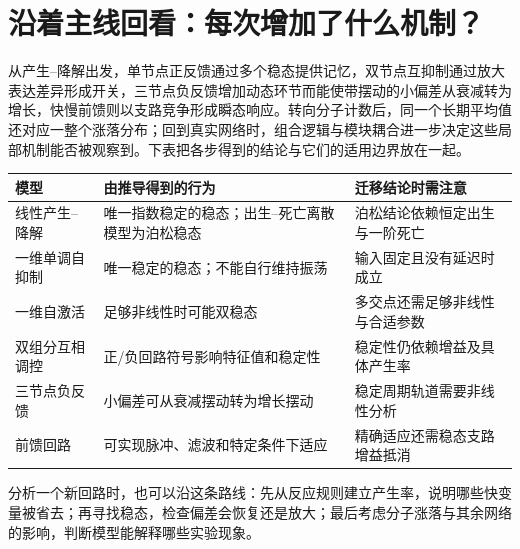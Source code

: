 \chapter{沿着主线回看：每次增加了什么机制？}
从产生--降解出发，单节点正反馈通过多个稳态提供记忆，双节点互抑制通过放大表达差异形成开关，三节点负反馈增加动态环节而能使带摆动的小偏差从衰减转为增长，快慢前馈则以支路竞争形成瞬态响应。转向分子计数后，同一个长期平均值还对应一整个涨落分布；回到真实网络时，组合逻辑与模块耦合进一步决定这些局部机制能否被观察到。下表把各步得到的结论与它们的适用边界放在一起。
\begin{center}\begin{tabular}{>{\raggedright\arraybackslash}p{3.1cm}>{\raggedright\arraybackslash}p{6cm}>{\raggedright\arraybackslash}p{5.6cm}}\toprule
模型 & 由推导得到的行为 & 迁移结论时需注意\\\midrule
线性产生--降解 & 唯一指数稳定的稳态；出生--死亡离散模型为泊松稳态 & 泊松结论依赖恒定出生与一阶死亡\\
一维单调自抑制 & 唯一稳定的稳态；不能自行维持振荡 & 输入固定且没有延迟时成立\\
一维自激活 & 足够非线性时可能双稳态 & 多交点还需足够非线性与合适参数\\
双组分互相调控 & 正/负回路符号影响特征值和稳定性 & 稳定性仍依赖增益及具体产生率\\
三节点负反馈 & 小偏差可从衰减摆动转为增长摆动 & 稳定周期轨道需要非线性分析\\
前馈回路 & 可实现脉冲、滤波和特定条件下适应 & 精确适应还需稳态支路增益抵消\\
\bottomrule\end{tabular}\end{center}

分析一个新回路时，也可以沿这条路线：先从反应规则建立产生率，说明哪些快变量被省去；再寻找稳态，检查偏差会恢复还是放大；最后考虑分子涨落与其余网络的影响，判断模型能解释哪些实验现象。
